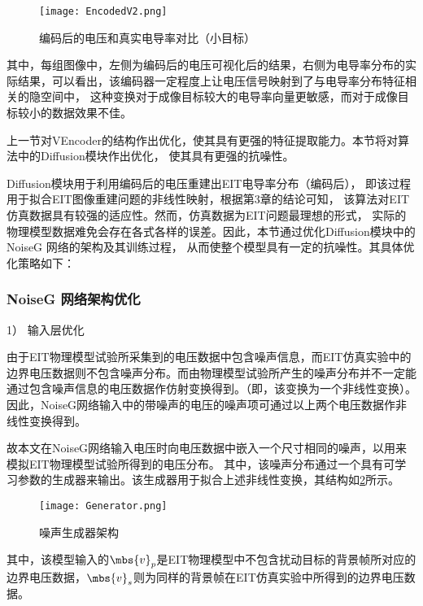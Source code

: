 \begin{figure}[H]
    \centering
    \texttt{[image: EncodedV2.png]}
    \caption{编码后的电压和真实电导率对比（小目标）}
    \label{figure:EncodedV2}
\end{figure}

其中，每组图像中，左侧为编码后的电压可视化后的结果，右侧为电导率分布的实际结果，可以看出，该编码器一定程度上让电压信号映射到了与电导率分布特征相关的隐空间中，
这种变换对于成像目标较大的电导率向量更敏感，而对于成像目标较小的数据效果不佳。


上一节对VEncoder的结构作出优化，使其具有更强的特征提取能力。本节将对算法中的Diffusion模块作出优化，
使其具有更强的抗噪性。

Diffusion模块用于利用编码后的电压重建出EIT电导率分布（编码后），
即该过程用于拟合EIT图像重建问题的非线性映射，根据第3章的结论可知，
该算法对EIT仿真数据具有较强的适应性。然而，仿真数据为EIT问题最理想的形式，
实际的物理模型数据难免会存在各式各样的误差。因此，本节通过优化Diffusion模块中的NoiseG 网络的架构及其训练过程，
从而使整个模型具有一定的抗噪性。其具体优化策略如下：

\subsubsection{NoiseG 网络架构优化}
 


1） 输入层优化
 
由于EIT物理模型试验所采集到的电压数据中包含噪声信息，而EIT仿真实验中的边界电压数据则不包含噪声分布。而由物理模型试验所产生的噪声分布并不一定能通过包含噪声信息的电压数据作仿射变换得到。（即，该变换为一个非线性变换）。因此，NoiseG网络输入中的带噪声的电压的噪声项可通过以上两个电压数据作非线性变换得到。

 
故本文在NoiseG网络输入电压时向电压数据中嵌入一个尺寸相同的噪声，以用来模拟EIT物理模型试验所得到的电压分布。
其中，该噪声分布通过一个具有可学习参数的生成器来输出。该生成器用于拟合上述非线性变换，其结构如\cref{figure:Generator}所示。

\begin{figure}[h]
    \centering
    \texttt{[image: Generator.png]}
    \caption{噪声生成器架构}
    \label{figure:Generator}
\end{figure}


其中，该模型输入的$\mbs{v}_p$是EIT物理模型中不包含扰动目标的背景帧所对应的边界电压数据，$\mbs{v}_s$则为同样的背景帧在EIT仿真实验中所得到的边界电压数据。
 
